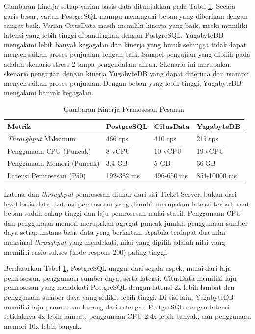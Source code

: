 Gambaran kinerja setiap varian basis data ditunjukkan pada Tabel \ref{table:kinerja-pemrosesan-pesanan}. Secara garis besar, varian PostgreSQL mampu menangani beban yang diberikan dengan sangat baik. Varian CitusData masih memiliki kinerja yang baik, meski memiliki latensi yang lebih tinggi dibandingkan dengan PostgreSQL. YugabyteDB mengalami lebih banyak kegagalan dan kinerja yang buruk sehingga tidak dapat menyelesaikan proses penjualan dengan baik. Sampel pengujian yang dipilih pada adalah skenario stress-2 tanpa pengendalian aliran. Skenario ini merupakan skenario pengujian dengan kinerja YugabyteDB yang dapat diterima dan mampu menyelesaikan proses penjualan. Dengan beban yang lebih tinggi, YugabyteDB mengalami banyak kegagalan.

\begin{table}[h]
    \centering
    \caption{Gambaran Kinerja Permosesan Pesanan}
    \label{table:kinerja-pemrosesan-pesanan}
    \begin{tabular}{|l|l|l|l|}
        \hline
        \textbf{Metrik}              & \textbf{PostgreSQL} & \textbf{CitusData} & \textbf{YugabyteDB} \\
        \hline
        \textit{Throughput} Maksimum & 466 rps             & 410 rps            & 216 rps             \\
        \hline
        Penggunaan CPU (Puncak)      & 8 vCPU              & 10 vCPU            & 19 vCPU             \\
        \hline
        Penggunaan Memori (Puncak)   & 3.4 GB              & 5 GB               & 36 GB               \\
        \hline
        Latensi Pemrosesan (P50)     & 192-382 ms          & 496-650 ms         & 854-10000 ms        \\
        \hline
    \end{tabular}
\end{table}

Latensi dan \textit{throughput} pemrosesan diukur dari sisi Ticket Server, bukan dari level basis data. Latensi pemrosesan yang diambil merupakan latensi terbaik saat beban sudah cukup tinggi dan laju pemrosesan mulai stabil. Penggunaan CPU dan penggunaan memori merupakan agregat puncak jumlah penggunaan sumber daya setiap instans basis data yang berkaitan. Apabila terdapat dua nilai maksimal \textit{throughput} yang mendekati, nilai yang dipilih adalah nilai yang memiliki rasio sukses (kode respons 200) paling tinggi.

Berdasarkan Tabel \ref{table:kinerja-pemrosesan-pesanan}, PostgreSQL unggul dari segala aspek, mulai dari laju pemrosesan, penggunaan sumber daya, serta latensi. CitusData memiliki laju pemrosesan yang mendekati PostgreSQL dengan latensi 2x lebih lambat dan penggunaan sumber daya yang sedikit lebih tinggi. Di sisi lain, YugabyteDB memiliki laju pemrosesan kurang dari setengah PostgreSQL dengan latensi setidaknya 4x lebih lambat, penggunaan CPU 2.4x lebih banyak, dan penggunaan memori 10x lebih banyak.

